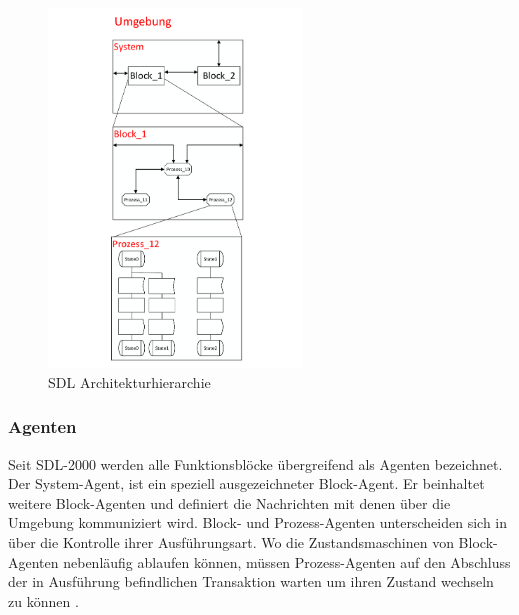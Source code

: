 \begin{figure}[h]
	\centering
	\includegraphics[width=0.6\textwidth]{Graphics/Agenten.pdf}
	\caption{SDL Architekturhierarchie}
	\label{fig:Agenten}
\end{figure}

\subsubsection{Agenten}
Seit \ac{SDL}-2000 werden alle Funktionsblöcke übergreifend als Agenten bezeichnet. Der System-Agent, ist ein speziell ausgezeichneter Block-Agent. Er beinhaltet weitere Block-Agenten und definiert die Nachrichten mit denen über die Umgebung kommuniziert wird. Block- und Prozess-Agenten unterscheiden sich in über die Kontrolle ihrer Ausführungsart. Wo die Zustandsmaschinen von Block-Agenten nebenläufig ablaufen können, müssen Prozess-Agenten auf den Abschluss der in Ausführung befindlichen Transaktion warten um ihren Zustand wechseln zu können \cite[29\psq]{ITUT101_2016}.


